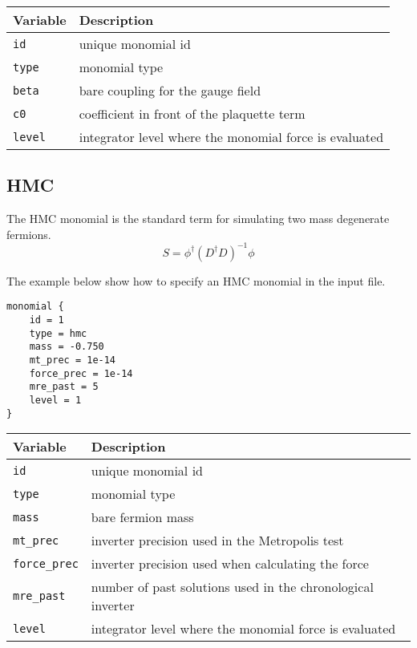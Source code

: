 \documentclass[12pt]{article}
\begin{document}
\vspace{2mm}

\begin{center}
\begin{tabular}{l|l}
 Variable & Description \\
 \hline
 \verb|id|    & unique monomial id \\
 \verb|type|  & monomial type \\
 \verb|beta|  & bare coupling for the gauge field \\
 \verb|c0|    & coefficient in front of the plaquette term \\
 \verb|level| & integrator level where the monomial force is evaluated
\end{tabular}
\end{center}

\newpage
\subsection*{HMC}
The HMC monomial is the standard term for simulating two mass degenerate fermions.
\begin{equation}
 S = \phi^\dagger(D^\dagger D)^{-1}\phi
\end{equation}

The example below show how to specify an HMC monomial in the input file.
\begin{center}
\begin{minipage}{55mm}
\begin{framed}
\begin{verbatim}
monomial {
    id = 1
    type = hmc
    mass = -0.750
    mt_prec = 1e-14
    force_prec = 1e-14
    mre_past = 5
    level = 1
}
\end{verbatim}
\vspace{-5mm}
\end{framed}
\end{minipage}
\end{center}

\vspace{2mm}

\begin{center}
\begin{tabular}{l|l}
 Variable & Description \\
 \hline
 \verb|id|         & unique monomial id \\
 \verb|type|       & monomial type \\
 \verb|mass|       & bare fermion mass \\
 \verb|mt_prec|    & inverter precision used in the Metropolis test \\
 \verb|force_prec| & inverter precision used when calculating the force \\
 \verb|mre_past|   & number of past solutions used in the chronological inverter \\
 \verb|level|      & integrator level where the monomial force is evaluated
\end{tabular}
\end{center}
\end{document}
